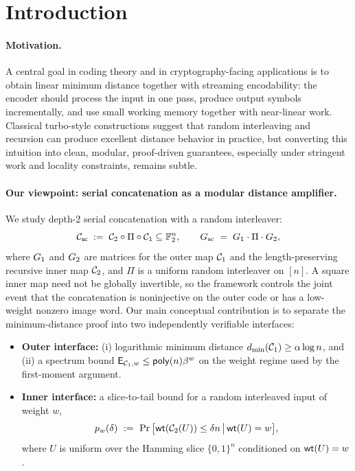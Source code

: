 \section{Introduction}
\label{sec:intro}

\paragraph{Motivation.}
A central goal in coding theory and in cryptography-facing applications is to obtain linear minimum distance together with
streaming encodability: the encoder should process the input in one pass, produce output symbols incrementally, and use
small working memory together with near-linear work.  Classical turbo-style constructions suggest that random interleaving
and recursion can produce excellent distance behavior in practice, but converting this intuition into
clean, modular, proof-driven guarantees, especially under stringent work and locality constraints, remains subtle.

\paragraph{Our viewpoint: serial concatenation as a modular distance amplifier.}
We study depth-2 serial concatenation with a random interleaver:
\[
{\mathcal{C}_{\mathsf{sc}}} \;:=\; {\mathcal{C}_2} \circ \Pi \circ {\mathcal{C}_1} \subseteq \mathbb{F}_2^n,
\qquad
G_{\mathrm{sc}} \;=\; {G_1} \cdot \Pi \cdot {G_2},
\]
where \({G_1}\) and \({G_2}\) are matrices for the outer map \({\mathcal{C}_1}\) and
the length-preserving recursive inner map \({\mathcal{C}_2}\), and \(\Pi\) is a uniform
random interleaver on \([n]\).  A square inner map need not be globally
invertible, so the framework controls the joint event that the concatenation
is noninjective on the outer code or has a low-weight nonzero image word.
Our main conceptual contribution is to separate the minimum-distance proof into two independently verifiable interfaces:

\begin{itemize}
\item \textbf{Outer interface:} (i) logarithmic minimum distance \(d_{\min}({\mathcal{C}_1})\ge \alpha\log n\), and
(ii) a spectrum bound \(\mathsf{E}_{{\mathcal{C}_1},w}\le \mathsf{poly}(n)\beta^w\) on the weight regime used by the first-moment argument.
\item \textbf{Inner interface:} a slice-to-tail bound for a random interleaved input of weight \(w\),
\[
p_w(\delta)\ :=\ \Pr\big[\mathsf{wt}({\mathcal{C}_2}(U))\le \delta n \,\big|\, \mathsf{wt}(U)=w\big],
\]
where \(U\) is uniform over the Hamming slice \(\{0,1\}^n\) conditioned on \(\mathsf{wt}(U)=w\).
\end{itemize}

